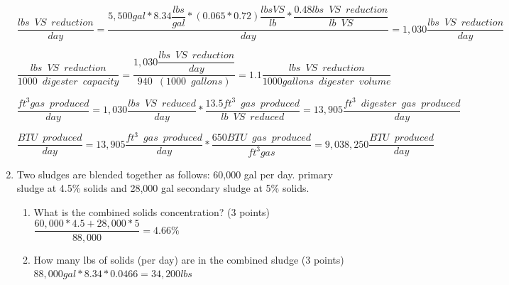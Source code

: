 \documentclass{article}
\begin{document}
\begin{enumerate}
{
$
	\dfrac
	{
	lbs \enspace VS \enspace reduction
	}
	{
	day
	}
	=
	\dfrac
	{
	5,500 gal * 8.34 \dfrac{lbs}{gal}*(0.065*0.72) \dfrac{lbs VS}{lb}*\dfrac{0.48 lbs \enspace VS \enspace  reduction}{lb \enspace VS}
	}
	{
	day
	}
 	=1,030
	\dfrac
	{
	lbs \enspace VS \enspace reduction
	}
	{
	day 
	}
$
}\\
\vspace{3mm}


{
$
	\dfrac
	{
	lbs \enspace VS \enspace reduction
	}
	{
	1000 \enspace digester \enspace capacity
	}
	=
	\dfrac
	{
	1,030 \dfrac
			{
			lbs \enspace VS \enspace reduction
			}
			{
			day
			}
	}
	{	
	940 \enspace (1000 \enspace gallons)
	}
 	=1.1
	\dfrac
	{
	lbs \enspace VS \enspace reduction
	}
	{
	1000 gallons \enspace digester \enspace volume 
	}
$
}\\
\vspace{3mm}


{
$
	\dfrac 
	{
	ft^3 gas \enspace produced
	}
	{
	day
	}
	=
	1,030 \dfrac
			{
			lbs \enspace VS \enspace reduced
			}
			{
			day
			}
			*
		\dfrac
		{
		13.5 ft^3 \enspace gas \enspace produced
		}
		{
		lb \enspace VS \enspace reduced
		}
		=13,905 \dfrac
				{
				ft^3 \enspace digester \enspace 					gas \enspace produced
				}
				{
				day
				}
$
}\\
\vspace{3mm}



{
$
	\dfrac 
	{
	BTU \enspace produced
	}
	{
	day
	}
	=
	13,905 \dfrac
			{
			ft^3 \enspace gas \enspace produced
			}
			{
			day
			}
			*
		\dfrac
		{
		650 BTU \enspace gas \enspace produced
		}
		{
		ft^3 gas
		}
		=9,038,250 \dfrac
				{
				BTU \enspace produced
				}
				{
				day
				}
$
}

\item Two sludges are blended together as follows: 60,000 gal per day. primary sludge at 4.5\% solids and 28,000 gal secondary sludge at 5\% solids. 
\begin{enumerate}
\item What is the combined solids concentration?  (3 points)\\

$\dfrac{60,000*4.5+28,000*5}{88,000}=\boxed{4.66\%}$\\
\vspace{2cm}
\item How many lbs of solids (per day) are in the combined sludge (3 points)\\

$88,000 gal*8.34*0.0466 = \boxed{34,200 lbs}$\\
\vspace{2cm}



\end{enumerate}
\end{enumerate}
\end{document}
